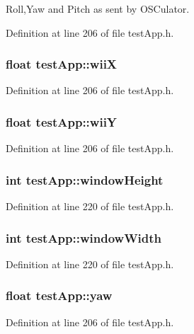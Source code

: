 Roll,Yaw and Pitch as sent by O\-S\-Culator. 



Definition at line 206 of file test\-App.\-h.

\hypertarget{group___wii_mote_ga7a77e8633c3a94e3e409a33a5cd9ae3f}{
\subsubsection[{wii\-X}]{\setlength{\rightskip}{0pt plus 5cm}float test\-App\-::wii\-X}}\label{group___wii_mote_ga7a77e8633c3a94e3e409a33a5cd9ae3f}


Definition at line 206 of file test\-App.\-h.

\hypertarget{group___wii_mote_ga5ae41896388ae16ee530beca5333e02a}{
\subsubsection[{wii\-Y}]{\setlength{\rightskip}{0pt plus 5cm}float test\-App\-::wii\-Y}}\label{group___wii_mote_ga5ae41896388ae16ee530beca5333e02a}


Definition at line 206 of file test\-App.\-h.

\hypertarget{group___wii_mote_ga4e8884eeef5b2657b62278969d4e3dcf}{
\subsubsection[{window\-Height}]{\setlength{\rightskip}{0pt plus 5cm}int test\-App\-::window\-Height}}\label{group___wii_mote_ga4e8884eeef5b2657b62278969d4e3dcf}


Definition at line 220 of file test\-App.\-h.

\hypertarget{group___wii_mote_ga9ed611377cd46f5148a3a3d538e96484}{
\subsubsection[{window\-Width}]{\setlength{\rightskip}{0pt plus 5cm}int test\-App\-::window\-Width}}\label{group___wii_mote_ga9ed611377cd46f5148a3a3d538e96484}


Definition at line 220 of file test\-App.\-h.

\hypertarget{group___wii_mote_ga865985f78dd5def3ed20c87b9fc772b6}{
\subsubsection[{yaw}]{\setlength{\rightskip}{0pt plus 5cm}float test\-App\-::yaw}}\label{group___wii_mote_ga865985f78dd5def3ed20c87b9fc772b6}


Definition at line 206 of file test\-App.\-h.

